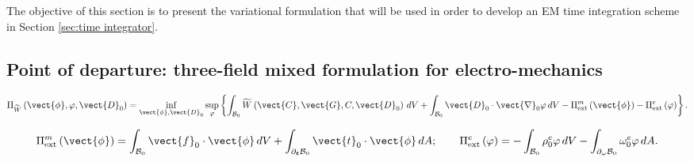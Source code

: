 The objective of this section is to present the variational formulation that will be used in order to develop an EM time integration scheme in Section \ref{sec:time integrator}. 

\subsection{Point of departure: three-field mixed formulation for electro-mechanics}\label{sec:mixed formulation}


%
\begin{equation}\label{eqn:mixed variational principle}
\begin{aligned}
\Pi_{\widetilde{W}}\left(\vect{\phi},\varphi,\vect{D}_0\right) = \inf_{\vect{\phi}, \vect{D}_0}\sup_{\varphi}\left\{
\int_{\mathcal{B}_0}\widetilde{W}\left(\vect{C},\vect{G},C,\vect{D}_0\right)\,dV + \int_{\mathcal{B}_0}\vect{D}_0\cdot\vect{\nabla}_0\varphi\,dV - \Pi_{\text{ext}}^m\left(\vect{\phi}\right) - \Pi_{\text{ext}}^e\left(\varphi\right)
%
\right\}.
\end{aligned}
\end{equation}
%
%

%
\begin{equation}\label{eqn:external terms in the potential}
\Pi_{\text{ext}}^m\left(\vect{\phi}\right) = \int_{\mathcal{B}_0}\vect{f}_0\cdot\vect{\phi}\,dV + 
\int_{\partial_{\boldsymbol{t}}\mathcal{B}_0}\vect{t}_0\cdot\vect{\phi}\,dA;\qquad  
%
\Pi_{\text{ext}}^e\left({\varphi}\right) = -\int_{\mathcal{B}_0}\rho^e_0{\varphi}\,dV -
\int_{\partial_\omega\mathcal{B}_0}\omega_0^e{\varphi}\,dA.
\end{equation}

